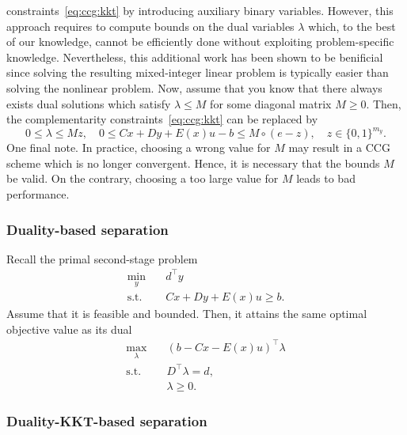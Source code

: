 constraints~\eqref{eq:ccg:kkt} by introducing auxiliary binary variables.
However, this approach requires to compute bounds on the dual variables
$\lambda$ which, to the best of our knowledge, cannot be efficiently done
without exploiting problem-specific knowledge. Nevertheless, this additional
work has been shown to be benificial since solving the resulting mixed-integer
linear problem is typically easier than solving the nonlinear problem. Now,
assume that you know that there always exists dual solutions which satisfy
$\lambda \le M$ for some diagonal matrix $M \ge 0$. Then, the complementarity
constraints~\eqref{eq:ccg:kkt} can be replaced by
\begin{equation*}
    0 \le \lambda \le Mz, \quad 
    0 \le Cx + Dy + E(x)u - b \le M\circ(e - z), \quad 
    z\in\{0,1\}^{m_y}.
\end{equation*}
One final note. In practice, choosing a wrong value for $M$ may result in a
CCG scheme which is no longer convergent. Hence, it is necessary that the
bounds $M$ be valid. On the contrary, choosing a too large value for $M$ leads
to bad performance. 

\subsubsection*{Duality-based separation}

Recall the primal second-stage problem
\begin{subequations}
    \begin{align*}
        \min_{y} \quad & d^\top y \\
        \text{s.t.} \quad & Cx + Dy + E(x)u \ge b.
    \end{align*}
\end{subequations}
Assume that it is feasible and bounded. Then, it attains the same optimal
objective value as its dual
\begin{subequations}
    \begin{align*}
        \max_{\lambda} \quad & (b - Cx - E(x)u)^\top\lambda \\
        \text{s.t.} \quad & D^\top \lambda = d, \\
        & \lambda \ge 0.
    \end{align*}
\end{subequations}

\subsubsection*{Duality-KKT-based separation}

